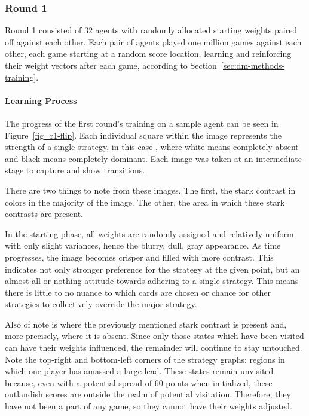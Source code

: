 

\subsubsection*{Round 1}
\label{sec:findings-r1}


Round 1 consisted of 32 agents with randomly allocated starting weights
paired off against each other.
%
Each pair of agents played one million games against each other,
each game starting at a random score location,
learning and reinforcing their weight vectors after each game,
according to Section~\ref{sec:dm-methods-training}.

\paragraph*{Learning Process}


The progress of the first round's training on a sample agent can be seen
in Figure~\ref{fig_r1-flip}.
%
Each individual square within the image represents the strength of a single
strategy,
in this case \handmaxavg,
where white means completely absent and black means completely dominant.
%
Each image was taken at an intermediate stage to capture and show transitions.

There are two things to note from these images.
%
The first, the stark contrast in colors in the majority of the image.
%
The other, the area in which these stark contrasts are present.

In the starting phase,
all weights are randomly assigned and relatively uniform with only slight
variances,
hence the blurry, dull, gray appearance.
%
As time progresses,
the image becomes crisper and filled with more contrast.
%
This indicates not only stronger preference for the strategy at the given
point,
but an almost all-or-nothing attitude towards adhering to a single strategy.
%
This means there is little to no nuance to which cards are chosen
or chance for other strategies to collectively override
the major strategy.

Also of note is where the previously mentioned stark contrast is present and,
more precisely,
where it is absent.
%
Since only those states which have been visited can have their weights
influenced,
the remainder will continue to stay untouched.
%
Note the top-right and bottom-left corners of the strategy graphs:
regions in which one player has amassed a large lead.
%
These states remain unvisited because,
even with a potential spread of 60 points when initialized,
these outlandish scores are outside the realm of potential visitation.
%
Therefore, they have not been a part of any game,
so they cannot have their weights adjusted.

